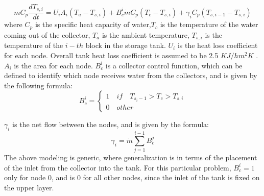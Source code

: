 \documentclass{article}
\begin{document}
\begin{equation}
mC_p \frac{dT_{s, i}}{dt} = U_i A_i (T_a - T_{s,i}) + B_c^i \dot{m} C_p (T_c - T_{s,i}) + \gamma_i C_p (T_{s, i-1} - T_{s,i})
\end{equation}
where $C_p$ is the specific heat capacity of water,$T_c$ is the temperature of the water coming out of the collector, $T_a$ is the ambient temperature, $T_{s, i}$ is the temperature of the $i-th$ block in the storage tank.  $U_i$ is the heat loss coefficient for each node. Overall tank heat loss coefficient is assumed to be 2.5 $KJ/h m^2 K$ . $A_i$ is the area for each node.
$B_c^i$ is a collector control function, which can be defined to identify which node receives water from the collectors, and is given by the following formula:
\begin{equation}
B_c^i = 
\begin{cases}
 1 \quad if \quad T_{s_i-1} > T_c > T_{s,i} \\
 0 \quad other  
\end{cases}
\end{equation}

$\gamma_i$ is the net flow between the nodes, and is given by the formula:
\begin{equation}
\gamma_i = \dot{m} \sum_{j = 1} ^{i-1} B_c^j
\end{equation}
The above modeling is generic, where generalization is in terms of the placement of the inlet from the collector into the tank. For this particular problem, $B_c^i = 1$ only for node $0$, and is $0$ for all other nodes, since the inlet of the tank is fixed on the upper layer.
\end{document}
